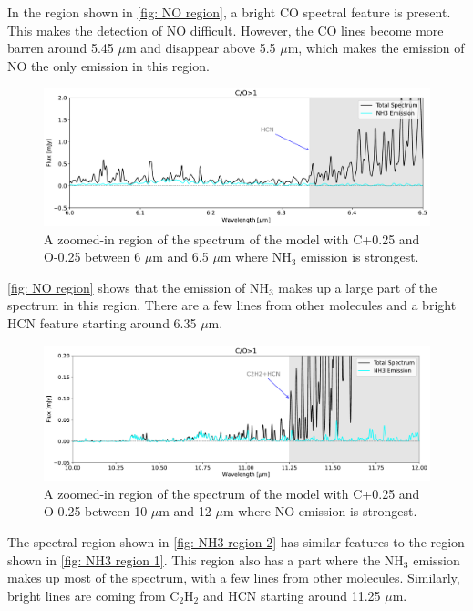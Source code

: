 \documentclass[twoside, single, authoryear, semicolon, 12pt]{lion-msc}
\newcommand{\4}{$_4$}
\newcommand{\3}{$_3$}
\newcommand{\2}{$_2$}
\begin{document}
In the region shown in \autoref{fig: NO region}, a bright CO spectral feature is present. This makes the detection of NO difficult. However, the CO lines become more barren around 5.45 $\mu$m and disappear above 5.5 $\mu$m, which makes the emission of NO the only emission in this region. 

\begin{figure}[H]
    \centering
    \includegraphics[width=\linewidth]{Figures/NH3_region1.pdf}
    \caption{A zoomed-in region of the spectrum of the model with C+0.25 and O-0.25 between 6 $\mu$m and 6.5 $\mu$m where NH\3 emission is strongest.}
    \label{fig: NH3 region 1}
\end{figure}

\autoref{fig: NO region} shows that the emission of NH\3 makes up a large part of the spectrum in this region. There are a few lines from other molecules and a bright HCN feature starting around 6.35 $\mu$m.

\begin{figure}[H]
    \centering
    \includegraphics[width=\linewidth]{Figures/NH3_region2.pdf}
    \caption{A zoomed-in region of the spectrum of the model with C+0.25 and O-0.25 between 10 $\mu$m and 12 $\mu$m where NO emission is strongest.}
    \label{fig: NH3 region 2}
\end{figure}

The spectral region shown in \autoref{fig: NH3 region 2} has similar features to the region shown in \autoref{fig: NH3 region 1}. This region also has a part where the NH\3 emission makes up most of the spectrum, with a few lines from other molecules. Similarly, bright lines are coming from C\2H\2 and HCN starting around 11.25 $\mu$m.
\end{document}
